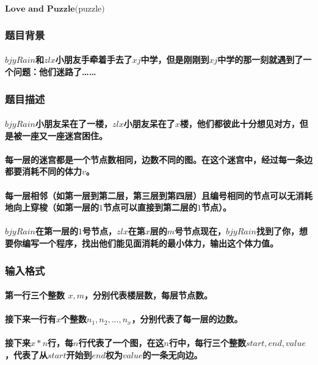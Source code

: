 \documentclass[final,11pt,oneside,UTF8]{report}
\begin{document}
\newpage

\centerline{\LARGE{$\textbf{Love and Puzzle}\text{(puzzle)}$}}
\subsubsection{题目背景}
\paragraph{$bjyRain$和$zlx$小朋友手牵着手去了$xj$中学，但是刚刚到$xj$中学的那一刻就遇到了一个问题：他们迷路了……}
\subsubsection{题目描述}
\paragraph{$bjyRain$小朋友呆在了一楼，$zlx$小朋友呆在了$x$楼，他们都彼此十分想见对方，但是被一座又一座迷宫困住。}
\paragraph{每一层的迷宫都是一个节点数相同，边数不同的图。在这个迷宫中，经过每一条边都要消耗不同的体力$v$。}
\paragraph{每一层相邻（如第一层到第二层，第三层到第四层）且编号相同的节点可以无消耗地向上穿梭（如第一层的$1$节点可以直接到第二层的$1$节点）。}
\paragraph{$bjyRain$在第一层的$1$号节点，$zlx$在第$x$层的$m$号节点现在，$bjyRain$找到了你，想要你编写一个程序，找出他们能见面消耗的最小体力，输出这个体力值。}
\subsubsection{输入格式}
\paragraph{第一行三个整数 $x,m$，分别代表楼层数，每层节点数。}
\paragraph{接下来一行有$x$个整数$n_1, n_2,...,n_x$，分别代表了每一层的边数。}
\paragraph{接下来$x * n$行，每$n$行代表了一个图，在这$n$行中，每行三个整数$start,end,value$，代表了从$start$开始到$end$权为$value$的一条无向边。}
\end{document}
